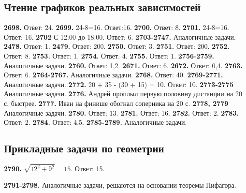\subsection{Чтение графиков реальных зависимостей}
\textbf{2698.} Ответ: 24. \textbf{2699.} 24-8=16. Ответ:16. \textbf{2700.} Ответ: 8.\newline
\textbf{2701.} 24-8=16. Ответ: 16. \textbf{2702} С 12:00 до 18:00. Ответ: 6.\newline
\textbf{2703-2747.} Аналогичные задачи.
\textbf{2478.} Ответ: 1.\newline
\textbf{2479.} Ответ: 200. \textbf{2750.} Ответ: 3. \textbf{2751.} Ответ: 200.\newline
\textbf{2752.} Ответ: 8. \textbf{2753.} Ответ: 1. \textbf{2754.} Ответ: 4. \newline 
\textbf{2755.} Ответ: 1.\newline
\textbf{2756-2759.} Аналогичные задачи.\newline
\textbf{2760.} Ответ: 1,2. \textbf{2671.} Ответ: 6. \textbf{2672.} Ответ: 0,4.\newline
\textbf{2763.} Ответ: 6.\newline
\textbf{2764-2767.} Аналогичные задачи.\newline
\textbf{2768.} Ответ: 40.\newline
\textbf{2769-2771.} Аналогичные задачи.\newline
\textbf{2772.} 20 + 35 - (30 + 15) = 10. Ответ: 10.\newline
\textbf{2773-2775} Аналогичные задачи.\newline
\textbf{2776.} Андрей проплыл первую половину дистанции на 20 с. быстрее.\newline
\textbf{2777.} Иван на финише обогнал соперника на 20 с.\newline
\textbf{2778, 2779} Аналогичные задачи.
\textbf{2780.} Ответ: 13.\newline
\textbf{2781.} Ответ: 16. \textbf{2782.} Ответ: 2. \textbf{2783.} Ответ: 2. \newline
\textbf{2784.} Ответ: 4,5.\newline
\textbf{2785-2789.} Аналогичные задачи.

\subsection{Прикладные задачи по геометрии}

\textbf{2790.} $\sqrt{12^2 + 9^2} = 15.$ Ответ: 15.

\textbf{2791-2798.} Аналогичные задачи, решаются на основании теоремы Пифагора.

